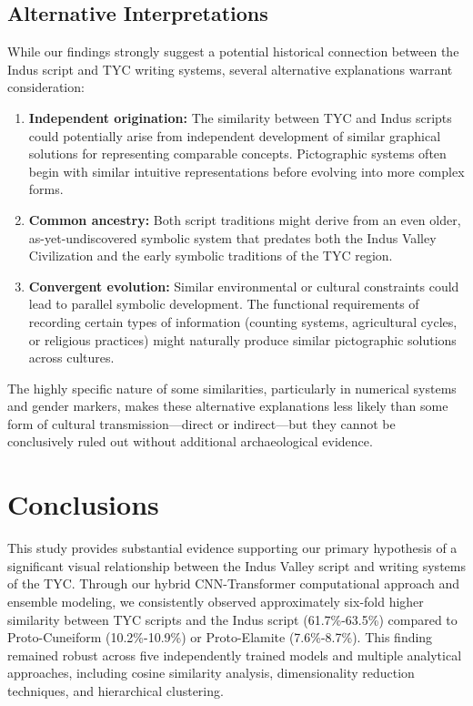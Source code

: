 \documentclass[11pt,a4paper,oneside]{report}
\begin{document}
\section{Alternative Interpretations}
\noindent\hspace{1cm}
While our findings strongly suggest a potential historical connection between the Indus script and TYC writing systems, several alternative explanations warrant consideration:

\begin{enumerate}
    \item \textbf{Independent origination:} The similarity between TYC and Indus scripts could potentially arise from independent development of similar graphical solutions for representing comparable concepts. Pictographic systems often begin with similar intuitive representations before evolving into more complex forms.
    \item \textbf{Common ancestry:} Both script traditions might derive from an even older, as-yet-undiscovered symbolic system that predates both the Indus Valley Civilization and the early symbolic traditions of the TYC region.
    \item \textbf{Convergent evolution:} Similar environmental or cultural constraints could lead to parallel symbolic development. The functional requirements of recording certain types of information (counting systems, agricultural cycles, or religious practices) might naturally produce similar pictographic solutions across cultures.

\end{enumerate}

The highly specific nature of some similarities, particularly in numerical systems and gender markers, makes these alternative explanations less likely than some form of cultural transmission—direct or indirect—but they cannot be conclusively ruled out without additional archaeological evidence.

\chapter{Conclusions}
\label{conclusions}
\noindent\hspace{1cm}
This study provides substantial evidence supporting our primary hypothesis of a significant visual relationship between the Indus Valley script and writing systems of the TYC. Through our hybrid CNN-Transformer computational approach and ensemble modeling, we consistently observed approximately six-fold higher similarity between TYC scripts and the Indus script (61.7\%-63.5\%) compared to Proto-Cuneiform (10.2\%-10.9\%) or Proto-Elamite (7.6\%-8.7\%). This finding remained robust across five independently trained models and multiple analytical approaches, including cosine similarity analysis, dimensionality reduction techniques, and hierarchical clustering.
\end{document}
